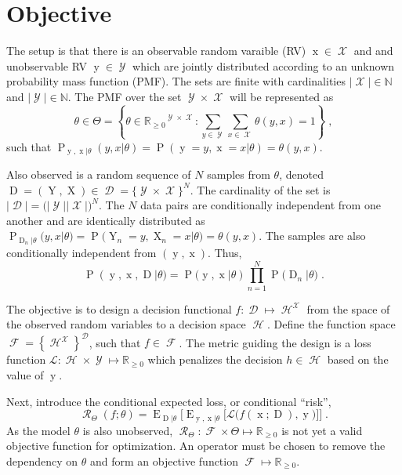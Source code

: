 \documentclass[12pt]{report}
\DeclareMathOperator{\xrm}{\mathrm{x}}
\DeclareMathOperator{\Xrm}{\mathrm{X}}
\DeclareMathOperator{\yrm}{\mathrm{y}}
\DeclareMathOperator{\Yrm}{\mathrm{Y}}
\DeclareMathOperator{\Drm}{\mathrm{D}}
\DeclareMathOperator{\Prm}{\mathrm{P}}
\DeclareMathOperator{\Erm}{\mathrm{E}}
\DeclareMathOperator{\Xcal}{\mathcal{X}}
\DeclareMathOperator{\Ycal}{\mathcal{Y}}
\DeclareMathOperator{\Dcal}{\mathcal{D}}
\DeclareMathOperator{\Hcal}{\mathcal{H}}
\DeclareMathOperator{\Fcal}{\mathcal{F}}
\DeclareMathOperator{\Rcal}{\mathcal{R}}
\begin{document}
\section{Objective}

The setup is that there is an observable random varaible (RV) $\xrm \in \Xcal$ and and unobservable RV $\yrm \in \Ycal$ which are jointly distributed according to an unknown probability mass function (PMF). The sets are finite with cardinalities $|\Xcal| \in \mathbb{N}$ and $|\Ycal| \in \mathbb{N}$. The PMF over the set $\Ycal \times \Xcal $ will be represented as
\begin{equation}
\theta \in \Theta = \left\{ \theta \in {\mathbb{R}_{\geq 0}}^{\Ycal \times \Xcal}: \sum_{y \in \Ycal} \sum_{x \in \Xcal}  \theta(y,x) = 1 \right\} \;,
\end{equation}
such that $\Prm_{\yrm,\xrm | \theta}(y,x | \theta) = \Prm(\yrm = y, \xrm = x | \theta) = \theta(y,x)$.

Also observed is a random sequence of $N$ samples from $\theta$, denoted $\Drm = ( \Yrm,\Xrm ) \in \Dcal = \{\Ycal \times \Xcal\}^N$. The cardinality of the set is $|\Dcal| = \big( |\Ycal| |\Xcal| \big)^N$. The $N$ data pairs are conditionally independent from one another and are identically distributed as $\Prm_{\Drm_n | \theta}(y,x | \theta) = \Prm\big( \Yrm_n = y, \Xrm_n = x | \theta \big) = \theta(y,x)$. The samples are also conditionally independent from $(\yrm,\xrm)$. Thus,
\begin{equation}
\Prm(\yrm,\xrm,\Drm | \theta) = \Prm(\yrm,\xrm | \theta) \prod_{n=1}^N \Prm\big( \Drm_n | \theta \big) \;.
\end{equation}

The objective is to design a decision functional $f: \Dcal \mapsto \Hcal^{\Xcal}$ from the space of the observed random variables to a decision space $\Hcal$. Define the function space $\Fcal = \left\{ {\Hcal^{\Xcal}} \right\}^{\Dcal}$, such that $f \in \Fcal$. The metric guiding the design is a loss function $\mathcal{L}: \Hcal \times \Ycal \mapsto \mathbb{R}_{\geq 0}$ which penalizes the decision $h \in \Hcal$ based on the value of $\yrm$. 

Next, introduce the conditional expected loss, or conditional ``risk'',
\begin{equation} \label{eq:risk_cond}
\Rcal_{\Theta}(f ; \theta) = \Erm_{\Drm | \theta} \bigg[ \Erm_{\yrm,\xrm | \theta} \Big[ \mathcal{L}\big( f(\xrm;\Drm),\yrm \big) \Big] \bigg] \;.
\end{equation}
As the model $\theta$ is also unobserved, $\Rcal_{\Theta}: \Fcal \times \Theta \mapsto \mathbb{R}_{\geq 0}$ is not yet a valid objective function for optimization. An operator must be chosen to remove the dependency on $\theta$ and form an objective function $\Fcal \mapsto \mathbb{R}_{\geq 0}$.
\end{document}
